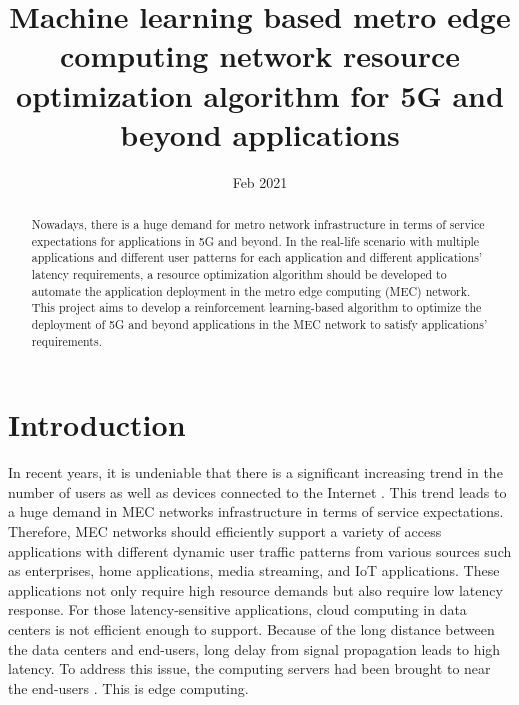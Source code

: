 \documentclass[conference]{IEEEtran}
\title{Machine learning based metro edge computing network resource optimization algorithm for 5G and beyond applications}
\author{\IEEEauthorblockN{Luong Quoc Dat}
\IEEEauthorblockA{\textit{Dept. of Electrical Engineering} \\
\textit{Technical University of Eindhoven}\\
}}
\date{Feb 2021}
\begin{document}
\maketitle

\begin{abstract}
Nowadays, there is a huge demand for metro network infrastructure in terms of service expectations for applications in 5G and beyond. In the real-life scenario with multiple applications and different user patterns for each application and different applications' latency requirements, a resource optimization algorithm should be developed to automate the application deployment in the metro edge computing (MEC) network. This project aims to develop a reinforcement learning-based algorithm to optimize the deployment of 5G and beyond applications in the MEC network to satisfy applications’ requirements. 
\end{abstract}

\section{Introduction}
\label{sec:Introduction}
In recent years, it is undeniable that there is a significant increasing trend in the number of users as well as devices connected to the Internet \cite{International2017}. This trend leads to a huge demand in MEC networks infrastructure in terms of service expectations. Therefore, MEC networks should efficiently support a variety of access applications with different dynamic user traffic patterns from various sources such as enterprises, home applications, media streaming, and IoT applications. These applications not only require high resource demands but also require low latency response. For those latency-sensitive applications, cloud computing in data centers is not efficient enough to support. Because of the long distance between the data centers and end-users, long delay from signal propagation leads to high latency. To address this issue, the computing servers had been brought to near the end-users \cite{Shi2016}. This is edge computing.
\end{document}
